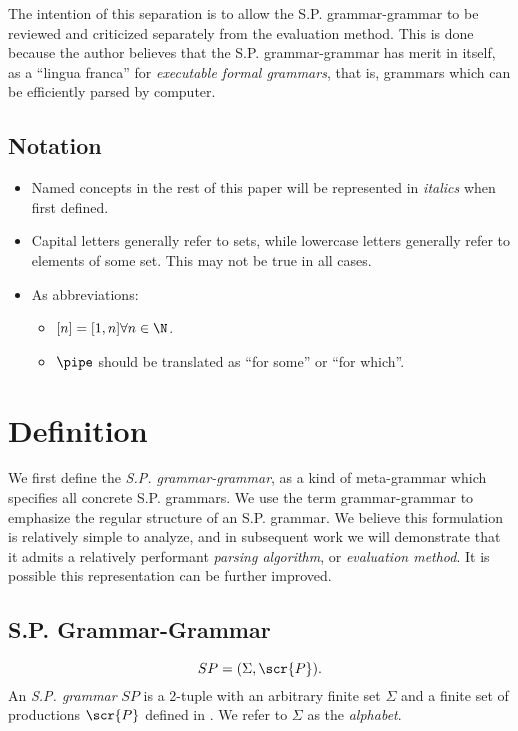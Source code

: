 \documentclass[10pt]{article}
\begin{document}
The intention of this separation is to allow the S.P. grammar-grammar to be reviewed and criticized separately from the evaluation method. This is done because the author believes that the S.P. grammar-grammar has merit in itself, as a ``lingua franca'' for \textit{executable formal grammars}, that is, grammars which can be efficiently parsed by computer.

\subsection{Notation}
\label{sec:notation}
\begin{itemize}
  \item Named concepts in the rest of this paper will be represented in \textit{italics} when first defined.
  \item Capital letters generally refer to sets, while lowercase letters generally refer to elements of some set. This may not be true in all cases.
  \item As abbreviations: \begin{itemize}
    \item $[n] = [1, n] \forall n \in \N$.
    \item $\pipe$ should be translated as ``for some'' or ``for which''.
  \end{itemize}
\end{itemize}

\section{Definition}
\label{sec:definition}
We first define the \textit{S.P. grammar-grammar}, as a kind of meta-grammar which specifies all concrete S.P. grammars. We use the term grammar-grammar to emphasize the regular structure of an S.P. grammar. We believe this formulation is relatively simple to analyze, and in subsequent work we will demonstrate that it admits a relatively performant \textit{parsing algorithm}, or \textit{evaluation method}. It is possible this representation can be further improved.

\subsection{S.P. Grammar-Grammar}
\label{sec:grammar-grammar}
\begin{equation}
  \label{eq:sp}
  SP = (\Sigma, \scr{P}).
\end{equation}
An \textit{S.P. grammar} $SP$ is a 2-tuple with an arbitrary finite set $\Sigma$ and a finite set of productions $\scr{P}$ defined in . We refer to $\Sigma$ as the \textit{alphabet}.
\end{document}

